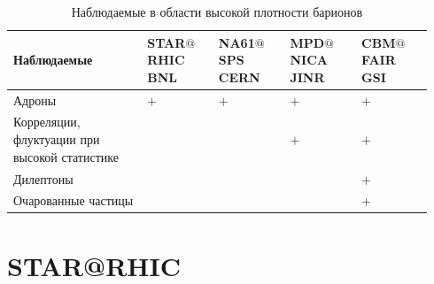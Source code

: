 \begin{table}[H]
\caption{Наблюдаемые в области высокой плотности барионов}
\label{tabl:Experiments2}
\begin{tabular}{ | p{0.30\linewidth} | p{0.16\linewidth} | p{0.16\linewidth} | p{0.16\linewidth} | p{0.16\linewidth} | }
\hline
\textbf{Наблюдаемые} & \textbf{STAR$@$RHIC} \newline \textbf{BNL} & \textbf{NA61$@$SPS} \newline \textbf{CERN} & \textbf{MPD$@$NICA} \newline \textbf{JINR} & \textbf{CBM$@$FAIR} \newline \textbf{GSI} \\
\hline
Адроны & $+$ & $+$ & $+$ & $+$ \\
\hline
Корреляции, флуктуации \newline при высокой статистике & & & $+$ & $+$ \\
\hline
Дилептоны & & & & $+$ \\
\hline
Очарованные \newline частицы & & & & $+$ \\
\hline
\end{tabular}
\end{table}


\section{STAR@RHIC}

